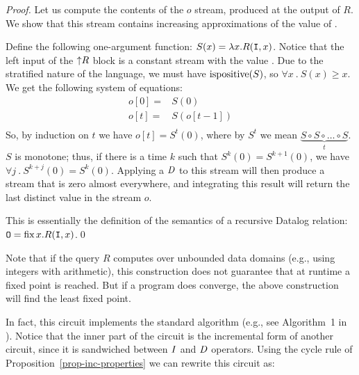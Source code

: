 \begin{proof}
Let us compute the contents of the $o$ stream, produced at the output
of $R$.  We show that this stream contains increasing approximations of the value of .

Define the following one-argument function: $S(x) = \lambda x . R(\mbox{\texttt{I}}, x)$.
Notice that the left input of the ${\uparrow}R$ block is a constant stream
with the value .  Due to the stratified nature of the language,
we must have $\mbox{ispositive}(S)$, so $\forall x~.~S(x) \geq x$.
We get the following system of equations:
$$
\begin{aligned}
o[0] =& S(0) \\
o[t] =& S(o[t-1]) \\
\end{aligned}
$$
So, by induction on $t$ we have $o[t] = S^t(0)$, where by
$S^t$ we mean $\underbrace{S \circ S \circ \ldots \circ S}_{t}$.
$S$ is monotone; thus, if there is a time $k$ such that $S^k(0) = S^{k+1}(0)$, we have
$\forall j~.~S^{k+j}(0) = S^k(0)$.  Applying a $\mathit{D}$ to this stream
will then produce a stream that is zero almost everywhere, and integrating
this result will return the last distinct value in the stream $o$.

This is essentially the definition of the semantics of a recursive Datalog relation:
$\mbox{\texttt{O}} = \mbox{fix}\,x.R(\mbox{\texttt{I}}, x)$.\qed
\end{proof}

Note that if the query $R$ computes over unbounded data domains (e.g.,
using integers with arithmetic), this construction does not guarantee
that at runtime a fixed point is reached.  But if a program does converge, the
above construction will find the least fixed point.

In fact, this circuit implements the standard 
algorithm (e.g., see Algorithm~1 in \cite{greco-sldm15}).
Notice that the inner part of the circuit is the incremental
form of another circuit, since it is sandwiched between $\mathit{I}$ and $\mathit{D}$ operators.
Using the cycle rule of Proposition~\ref{prop-inc-properties} we can rewrite this circuit as:
%
\begin{center}
\end{center}


